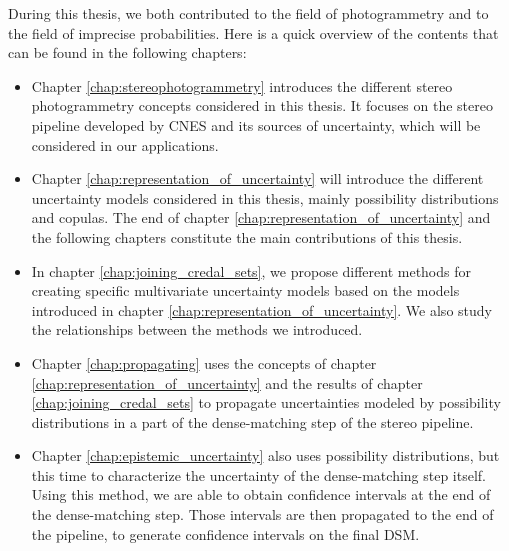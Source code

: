 During this thesis, we both contributed to the field of photogrammetry and to the field of imprecise probabilities. Here is a quick overview of the contents that can be found in the following chapters:
\begin{itemize}
    \item Chapter \ref{chap:stereophotogrammetry} introduces the different stereo photogrammetry concepts considered in this thesis. It focuses on the stereo pipeline developed by CNES and its sources of uncertainty, which will be considered in our applications.
    \item Chapter \ref{chap:representation_of_uncertainty} will introduce the different uncertainty models considered in this thesis, mainly possibility distributions and copulas. The end of chapter \ref{chap:representation_of_uncertainty} and the following chapters constitute the main contributions of this thesis.
    \item In chapter \ref{chap:joining_credal_sets}, we propose different methods for creating specific multivariate uncertainty models based on the models introduced in chapter \ref{chap:representation_of_uncertainty}. We also study the relationships between the methods we introduced.
    \item Chapter \ref{chap:propagating} uses the concepts of chapter \ref{chap:representation_of_uncertainty} and the results of chapter \ref{chap:joining_credal_sets} to propagate uncertainties modeled by possibility distributions in a part of the dense-matching step of the stereo pipeline.
    \item Chapter \ref{chap:epistemic_uncertainty} also uses possibility distributions, but this time to characterize the uncertainty of the dense-matching step itself. Using this method, we are able to obtain confidence intervals at the end of the dense-matching step. Those intervals are then propagated to the end of the pipeline, to generate confidence intervals on the final DSM.
\end{itemize}

